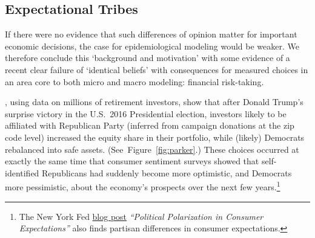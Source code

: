 \subsection{Expectational Tribes}\label{subsec:ExpTribes}\hypertarget{ExpTribes}{}

If there were no evidence that such differences of opinion matter for important economic decisions, the case for epidemiological modeling would be weaker.  We therefore conclude this `background and motivation' with some evidence of a recent clear failure of `identical beliefs' with consequences for measured choices in an area core to both micro and macro modeling: financial risk-taking.

, using data on millions of retirement investors, show that after Donald Trump's surprise victory in the U.S.\ 2016 Presidential election, investors likely to be affiliated with Republican Party (inferred from  campaign donations at the zip code level) increased the equity share in their portfolio, while (likely) Democrats rebalanced into safe assets. (See~Figure~\ref{fig:parker}.)  These choices occurred at exactly the same time that consumer sentiment surveys showed that self-identified Republicans had suddenly become more optimistic, and Democrats more pessimistic, about the economy's prospects over the next few years.\footnote{The New York Fed \href{https://libertystreeteconomics.newyorkfed.org/2017/12/political-polarization-in-consumer-expectation'}{blog post} \textit{``Political Polarization in Consumer Expectations''} also finds partisan differences in consumer expectations.}



